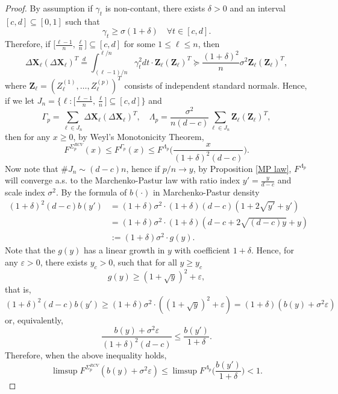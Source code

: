 \documentclass[a4paper,11pt]{article}
\theoremstyle{plain}
\theoremstyle{definition}
\begin{document}
    \begin{proof}
    	By assumption if $\gamma_t$ is non-contant, there exists $\delta > 0$ and an interval $[c, d] \subseteq [0, 1] $ such that
    	\[ \gamma_t \geq \sigma(1+\delta) \quad \forall t \in [c, d]. \]
    	Therefore, if $\big[ \frac{\ell - 1}{n}, \frac{\ell}{n} \big] \subseteq [c, d] $ for some $1 \leq \ell \leq n$, then
    	\[ \Delta \mathbf{X}_\ell (\Delta \mathbf{X}_\ell )^T \stackrel{d}{=} \int_{(\ell-1)/n}^{\ell/n} \gamma_t^2 dt \cdot \mathbf{Z}_\ell(\mathbf{Z}_\ell)^T \succeq \frac{(1+\delta)^2}{n} \sigma^2 \mathbf{Z}_\ell(\mathbf{Z}_\ell)^T,  \]
    	where $\mathbf{Z}_\ell = (Z_\ell^{(1)}, \dots , Z_\ell^{(p)})^T$ consists of independent standard normals. Hence, if we let $ J_n = \big\{ \ell: \big[ \frac{\ell - 1}{n}, \frac{\ell}{n} \big] \subseteq [c, d] \big\} $ and
    	\[ \Gamma_p = \sum_{\ell \in J_n} \Delta \mathbf{X}_\ell (\Delta \mathbf{X}_\ell )^T, \quad \Lambda_p = \frac{\sigma^2}{n(d-c)} \sum_{\ell \in J_n} \mathbf{Z}_\ell (\mathbf{Z}_\ell )^T,  \]
    	then for any $x \geq 0$, by Weyl's Monotonicity Theorem,
    	\[
    	F^{\Sigma_p^{RCV}}(x) \leq F^{\Gamma_p}(x) \leq F^{\Lambda_p}\bigg(\frac{x}{(1+\delta)^2(d-c)}\bigg).
    	\]
	    Now note that $\# J_n \sim (d-c)n$, hence if $p/n \rightarrow y$, by Proposition \ref{MP law}, $F^{\Lambda_p}$ will converge a.s. to the Marchenko-Pastur law with ratio index $y'=\frac{y}{d-c}$ and scale index $\sigma^2$.
	    By the formula of $b(\cdot)$ in Marchenko-Pastur density
	    \[
	    \begin{aligned}
	    (1+\delta)^2(d-c)b(y') &=(1+\delta)\sigma^2 \cdot (1+\delta)(d-c)(1+2\sqrt{y'}+y') \\
	    & =(1+\delta)\sigma^2 \cdot (1+\delta)(d-c + 2\sqrt{(d-c)y} + y) \\
	    & := (1+\delta)\sigma^2 \cdot  g(y).
	    \end{aligned}
	    \]
	    Note that the $g(y)$ has a linear growth in $y$ with coefficient $1+\delta$. Hence, for any $\varepsilon > 0$, there exists $y_c > 0$, such that for all $y \geq y_c$
	    \[ g(y) \geq (1+\sqrt{y})^2+\varepsilon,  \]
	    that is,
	    \[ (1+\delta)^2(d-c)b(y') \geq (1+\delta) \sigma^2 \cdot ((1+\sqrt{y})^2+\varepsilon) = (1+\delta)(b(y)+\sigma^2\varepsilon)  \]
	    or, equivalently,
	    \[ \frac{b(y) + \sigma^2\varepsilon}{(1+\delta)^2(d-c)} \leq \frac{b(y')}{1+\delta}. \]
	    Therefore, when the above inequality holds,
	    \[\limsup F^{\Sigma_p^{RCV}}(b(y) + \sigma^2\varepsilon) \leq \limsup F^{\Lambda_p}\bigg(\frac{b(y')}{1+\delta}\bigg) < 1. \]
    \end{proof}
    
\end{document}
